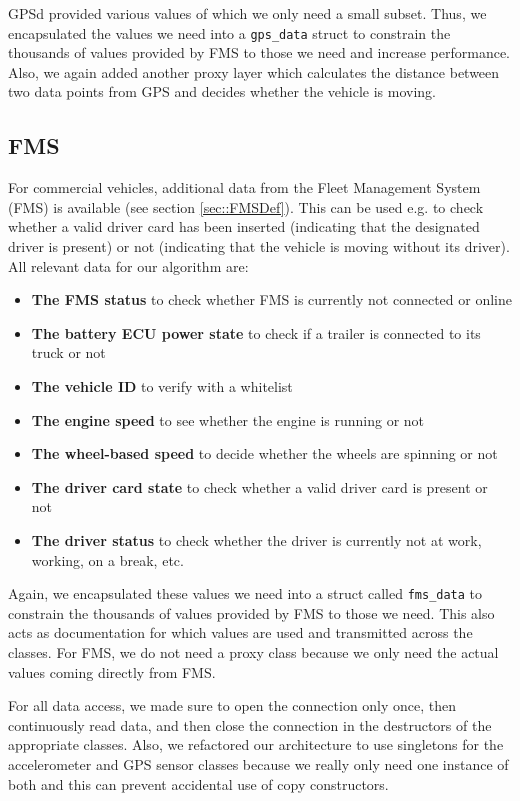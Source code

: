 GPSd provided various values of which we only need a small subset. Thus, we encapsulated the values we need into a \texttt{gps\_data} struct to constrain the thousands of values provided by FMS to those we need and increase performance. Also, we again added another proxy layer which calculates the distance between two data points from GPS and decides whether the vehicle is moving.

\subsection{FMS}
\label{sec::FMSUse}
For commercial vehicles, additional data from the Fleet Management System (FMS) is available (see section \ref{sec::FMSDef}). This can be used e.g. to check whether a valid driver card has been inserted (indicating that the designated driver is present) or not (indicating that the vehicle is moving without its driver). All relevant data for our algorithm are:

\begin{itemize}
	\item \textbf{The FMS status} to check whether FMS is currently not connected or online
	\item \textbf{The battery ECU power state} to check if a trailer is connected to its truck or not
	\item \textbf{The vehicle ID} to verify with a whitelist
	\item \textbf{The engine speed} to see whether the engine is running or not
	\item \textbf{The wheel-based speed} to decide whether the wheels are spinning or not
	\item \textbf{The driver card state} to check whether a valid driver card is present or not
	\item \textbf{The driver status} to check whether the driver is currently not at work, working, on a break, etc.
\end{itemize}

Again, we encapsulated these values we need into a struct called \texttt{fms\_data} to constrain the thousands of values provided by FMS to those we need. This also acts as documentation for which values are used and transmitted across the classes. For FMS, we do not need a proxy class because we only need the actual values coming directly from FMS.

\vspace{.5cm}

For all data access, we made sure to open the connection only once, then continuously read data, and then close the connection in the destructors of the appropriate classes. Also, we refactored our architecture to use singletons for the accelerometer and GPS sensor classes because we really only need one instance of both and this can prevent accidental use of copy constructors.

\clearpage
